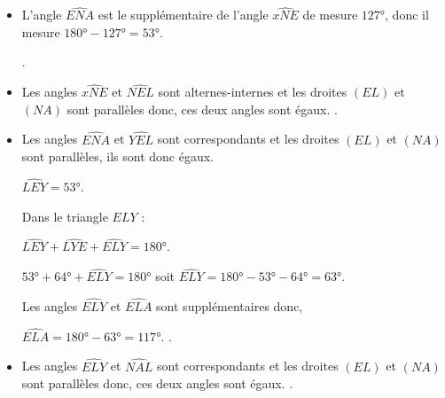 \begin{Maquette}[Fiche,CorrigeFin,Colonnes=2]{}
\begin{multicols}{2}
      \begin{Solution}
         \begin{itemize}
            \item L'angle $\widehat{ENA}$ est le supplémentaire de l'angle $\widehat{xNE}$ de mesure $\ang{127}$, donc il mesure $\ang{180}-\ang{127} =\ang{53}$. \par
               .
            \item Les angles $\widehat{xNE}$ et $\widehat{NEL}$ sont alternes-internes et les droites $(EL)$ et $(NA)$ sont parallèles donc, ces deux angles sont égaux. .
            \item Les angles $\widehat{ENA}$ et $\widehat{YEL}$ sont correspondants et les droites $(EL)$ et $(NA)$ sont parallèles, ils sont donc égaux. \par
               $\widehat{LEY} =\ang{53}$. \par
               Dans le triangle $ELY$ : \par
               $\widehat{LEY}+\widehat{LYE}+\widehat{ELY} =\ang{180}$. \par
               $\ang{53}+\ang{64}+\widehat{ELY} =\ang{180}$ soit $\widehat{ELY} =\ang{180}-\ang{53}-\ang{64} =\ang{63}$. \par
               Les angles $\widehat{ELY}$ et $\widehat{ELA}$ sont supplémentaires donc, \par
               $\widehat{ELA} =\ang{180}-\ang{63} =\ang{117}$. .
            \item Les angles $\widehat{ELY}$ et $\widehat{NAL}$ sont correspondants et les droites $(EL)$ et $(NA)$ sont parallèles donc, ces deux angles sont égaux. .
         \end{itemize}
      \end{Solution}

   \end{multicols}

\end{Maquette}


